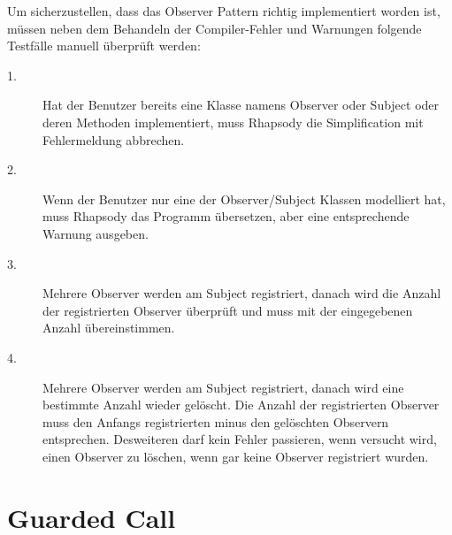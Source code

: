 Um sicherzustellen, dass das Observer Pattern richtig implementiert worden ist, müssen neben dem Behandeln der Compiler-Fehler und Warnungen folgende Testfälle manuell überprüft werden: 

\begin{description}

	\item[1.]
	Hat der Benutzer bereits eine Klasse namens Observer oder Subject oder deren Methoden implementiert, muss Rhapsody die Simplification mit Fehlermeldung abbrechen.
	
	\item[2.]
	Wenn der Benutzer nur eine der Observer/Subject Klassen modelliert hat, muss Rhapsody das Programm übersetzen, aber eine entsprechende Warnung ausgeben.
	
	\item[3.]
	Mehrere Observer werden am Subject registriert, danach wird die Anzahl der registrierten Observer überprüft und muss mit der eingegebenen Anzahl übereinstimmen.

	\item[4.]
	Mehrere Observer werden am Subject registriert, danach wird eine bestimmte Anzahl wieder gelöscht. Die Anzahl der registrierten Observer muss den Anfangs registrierten minus den gelöschten Observern entsprechen. Desweiteren darf kein Fehler passieren, wenn versucht wird, einen Observer zu löschen, wenn gar keine Observer registriert wurden.

\end{description}


\section{Guarded Call}


